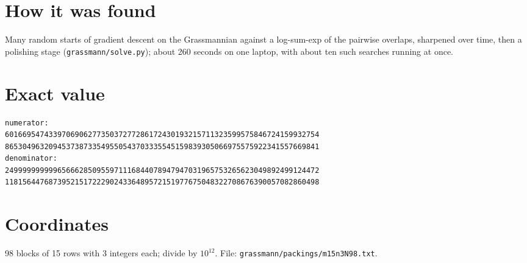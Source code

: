 \documentclass[11pt,a4paper]{article}
\begin{document}
\section{How it was found}
Many random starts of gradient descent on the Grassmannian against a log-sum-exp of the pairwise overlaps, sharpened over time, then a polishing stage (\texttt{grassmann/solve.py}); about 260 seconds on one laptop, with about ten such searches running at once.


\appendix
\section{Exact value}
{\small
\begin{verbatim}
numerator:
601669547433970690627735037277286172430193215711323599575846724159932754
865304963209453738733549550543703335545159839305066975575922341557669841
denominator:
249999999999656662850955971116844078947947031965753265623049892499124472
118156447687395215172229024336489572151977675048322708676390057082860498
\end{verbatim}}

\section{Coordinates}
98 blocks of 15 rows with 3 integers each; divide by $10^{12}$. File: \texttt{grassmann/packings/m15n3N98.txt}.
{\tiny
\begin{multicols}{3}
\end{multicols}}
\end{document}
